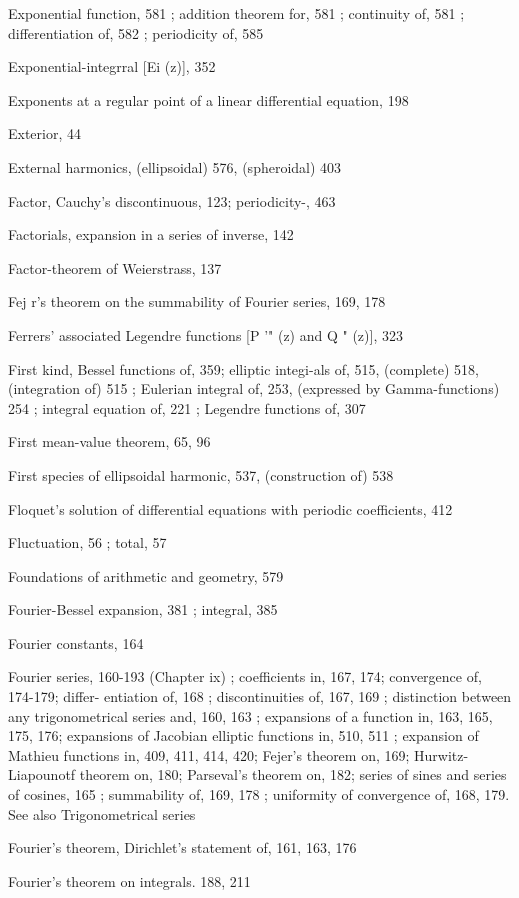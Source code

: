 Exponential function, 581 ; addition theorem for, 581 ; continuity of, 581 ; differentiation of,
582 ; periodicity of, 585

Exponential-integrral [Ei (z)], 352

Exponents at a regular point of a linear differential equation, 198

Exterior, 44

External harmonics, (ellipsoidal) 576, (spheroidal) 403

Factor, Cauchy's discontinuous, 123; periodicity-, 463

Factorials, expansion in a series of inverse, 142

Factor-theorem of Weierstrass, 137

Fej r's theorem on the summability of Fourier series, 169, 178

Ferrers' associated Legendre functions [P '" (z) and Q "  (z)], 323

First kind, Bessel functions of, 359; elliptic integi-als of, 515, (complete) 518, (integration of)
515 ; Eulerian integral of, 253, (expressed by Gamma-functions) 254 ; integral equation of,
221 ; Legendre functions of, 307

First mean-value theorem, 65, 96

First species of ellipsoidal harmonic, 537, (construction of) 538

Floquet's solution of differential equations with periodic coefficients, 412

Fluctuation, 56 ; total, 57

Foundations of arithmetic and geometry, 579

Fourier-Bessel expansion, 381 ; integral, 385

Fourier constants, 164

Fourier series, 160-193 (Chapter ix) ; coefficients in, 167, 174; convergence of, 174-179; differ-
entiation of, 168 ; discontinuities of, 167, 169 ; distinction between any trigonometrical
series and, 160, 163 ; expansions of a function in, 163, 165, 175, 176; expansions of Jacobian
elliptic functions in, 510, 511 ; expansion of Mathieu functions in, 409, 411, 414, 420; Fejer's
theorem on, 169; Hurwitz-Liapounotf theorem on, 180; Parseval's theorem on, 182; series
of sines and series of cosines, 165 ; summability of, 169, 178 ; uniformity of convergence of,
168, 179. See also Trigonometrical series

Fourier's theorem, Dirichlet's statement of, 161, 163, 176

%
%
Fourier's theorem on integrals. 188, 211


